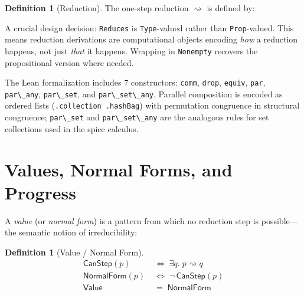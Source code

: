 \documentclass[11pt,a4paper]{article}
\makeatletter
\theoremstyle{definition}
\newtheorem{definition}[theorem]{Definition}
\theoremstyle{remark}
\newcommand{\pquote}[1]{@(#1)}
\newcommand{\pdrop}[1]{*(#1)}
\newcommand{\pout}[2]{#1\mathbin{!}(#2)}
\newcommand{\pin}[3]{\mathsf{for}(#1 \leftarrow #2)\{#3\}}
\newcommand{\ppar}[2]{\{#1 \mid #2\}}
\newcommand{\reduces}{\rightsquigarrow}
\newcommand{\SC}{\equiv}
\newcommand{\commSubst}[3]{#1[@(#3)/#2]}
\newcommand{\lean}[1]{\lstinline[language=Lean4]{#1}}
\makeatother
\begin{document}
\begin{definition}[Reduction]
\label{def:reduces}
The one-step reduction $\reduces$ is defined by:
\end{definition}

A crucial design decision: \lean{Reduces} is \lean{Type}-valued rather than
\lean{Prop}-valued. This means reduction derivations are computational objects
encoding \emph{how} a reduction happens, not just \emph{that} it happens.
Wrapping in \lean{Nonempty} recovers the propositional version where needed.

The Lean formalization includes 7 constructors: \lean{comm}, \lean{drop},
\lean{equiv}, \lean{par}, \lean{par\_any}, \lean{par\_set}, and
\lean{par\_set\_any}.  Parallel composition is encoded as ordered lists
(\lean{.collection .hashBag}) with permutation congruence in structural
congruence; \lean{par\_set} and \lean{par\_set\_any} are the analogous rules
for set collections used in the spice calculus.

\section{Values, Normal Forms, and Progress}
\label{sec:values}

A \emph{value} (or \emph{normal form}) is a pattern from which no
reduction step is possible---the semantic notion of irreducibility:

\begin{definition}[Value / Normal Form]
\label{def:value}
\begin{align*}
  \mathsf{CanStep}(p) &\;\iff\; \exists q.\; p \reduces q \\
  \mathsf{NormalForm}(p) &\;\iff\; \lnot\,\mathsf{CanStep}(p) \\
  \mathsf{Value} &\;=\; \mathsf{NormalForm}
\end{align*}
\end{definition}
\end{document}
